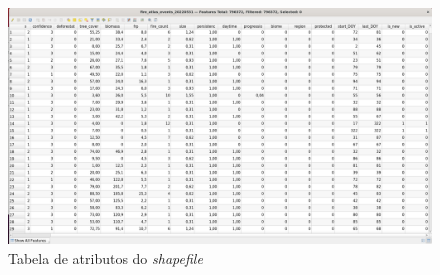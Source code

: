 \begin{figure}[htb]
	\centering
	\begin{minipage}{0.9\linewidth}
		\centering
		\includegraphics[width=\linewidth]{tg1/figuras/tabela_atributos.png}
		\caption{Tabela de atributos do \textit{shapefile}} \label{fig:tabat}
	\end{minipage}
\end{figure}

\newpage

